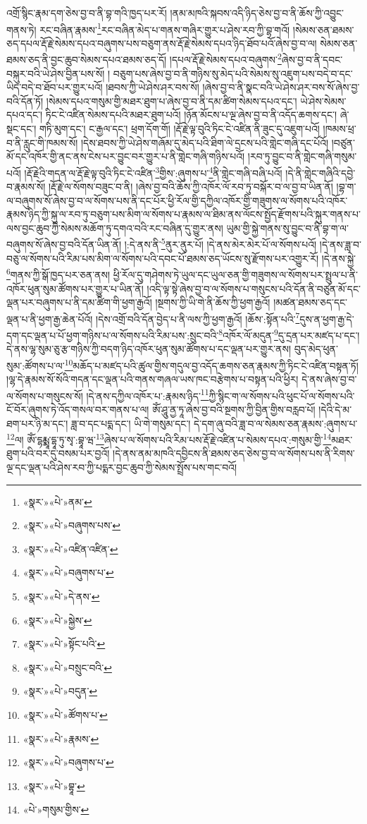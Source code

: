འགྲོ་སྙིང་རྣམ་དག་ཅེས་བྱ་བ་ནི་བྷ་གའི་ཁྱད་པར་རོ། །ནམ་མཁའི་སྐབས་འདི་ཉིད་ཅེས་བྱ་བ་ནི་ཆོས་ཀྱི་འབྱུང་གནས་ཏེ། རང་བཞིན་རྣམས་\footnote{«སྣར་»«པེ་»ནམ་}རང་བཞིན་མེད་པ་གནས་གཞིར་གྱུར་པ་ཤེས་རབ་ཀྱི་བྷ་གའོ། །སེམས་ཅན་ཐམས་ཅད་དཔལ་རྡོ་རྗེ་སེམས་དཔའ་བཞུགས་པས་བཅུག་ནས་རྡོ་རྗེ་སེམས་དཔའ་ཉིད་ཐོབ་པའོ་ཞེས་བྱ་བ་ལ། སེམས་ཅན་ཐམས་ཅད་ནི་བྱང་ཆུབ་སེམས་དཔའ་ཐམས་ཅད་དོ། །དཔལ་རྡོ་རྗེ་སེམས་དཔའ་བཞུགས་\footnote{«སྣར་»«པེ་»བཞུགས་པས་}ཞེས་བྱ་བ་ནི་དབང་བསྐུར་བའི་ཡེ་ཤེས་བྱིན་པས་སོ། །
བཅུག་པས་ཞེས་བྱ་བ་ནི་གཉིས་སུ་མེད་པའི་སེམས་སུ་འཇུག་པས་བདེ་བ་དང་ཡིད་བདེ་བ་ཐོབ་པར་གྱུར་པའོ། །ཐབས་ཀྱི་ཡེ་ཤེས་ཤར་བས་སོ། །ཞེས་བྱ་བ་ནི་སྣང་བའི་ཡེ་ཤེས་ཤར་བས་སོ་ཞེས་བྱ་བའི་དོན་ཏོ། །སེམས་དཔའ་གསུམ་གྱི་མཐར་ཐུག་པ་ཞེས་བྱ་བ་ནི་དམ་ཚིག་སེམས་དཔའ་དང་། ཡེ་ཤེས་སེམས་དཔའ་དང་། ཏིང་ངེ་འཛིན་སེམས་དཔའི་མཐར་ཐུག་པའོ། །ཉོན་མོངས་པ་ལྔ་ཞེས་བྱ་བ་ནི་འདོད་ཆགས་དང་། ཞེ་སྡང་དང་། གཏི་མུག་དང་། ང་རྒྱལ་དང་། ཕྲག་དོག་གོ། །རྡོ་རྗེ་ལྟ་བུའི་ཏིང་ངེ་འཛིན་ནི་ཟུང་དུ་འཇུག་པའོ། །ཁམས་ཕྲ་བ་ནི་རླུང་གི་ཁམས་སོ། །དེས་ཐབས་ཀྱི་ཡེ་ཤེས་གཞོམ་དུ་མེད་པའི་ཐིག་ལེ་དྲངས་པའི་གླེང་གཞི་དང་པོའོ། །བཙུན་མོ་དང་འཁོར་གྱི་ནང་ནས་ངེས་པར་བྱུང་བར་གྱུར་པ་ནི་གླེང་གཞི་གཉིས་པའོ། །རབ་ཏུ་བྱུང་བ་ནི་གླེང་གཞི་གསུམ་པའོ། །རྡོ་རྗེའི་གདན་ལ་རྡོ་རྗེ་ལྟ་བུའི་ཏིང་ངེ་འཛིན་\footnote{«སྣར་»«པེ་»འཛིན་འཛིན་}གྱིས་:ཞུགས་པ་\footnote{«སྣར་»«པེ་»བཞུགས་པ་}ནི་གླེང་གཞི་བཞི་པའོ། །དེ་ནི་གླེང་གཞིའི་དབྱེ་བ་རྣམས་སོ། །རྡོ་རྗེ་ལ་སོགས་བཟུང་བ་ནི། །ཞེས་བྱ་བའི་ཆོས་ཀྱི་འཁོར་ལོ་རབ་ཏུ་བསྐོར་བ་ལ་བྱ་བ་ཡིན་ནོ། །བྷ་ག་ལ་བཞུགས་སོ་ཞེས་བྱ་བ་ལ་སོགས་པས་ནི་དང་པོར་ཕྱི་རོལ་གྱི་དཀྱིལ་འཁོར་གྱི་གཟུགས་ལ་སོགས་པའི་འཁོར་རྣམས་ཉིད་ཀྱི་སྐུ་ལ་རབ་ཏུ་བཅུག་པས་མིག་ལ་སོགས་པ་རྣམས་ལ་ཐིམ་ནས་ལོངས་སྤྱོད་རྫོགས་པའི་སྐུར་གནས་པ་ལས་བྱང་ཆུབ་ཀྱི་སེམས་མཆོག་ཏུ་དགའ་བའི་རང་བཞིན་དུ་གྱུར་ནས། ཡུམ་གྱི་སྐྱེ་གནས་སུ་བྱུང་བ་ནི་བྷ་ག་ལ་བཞུགས་སོ་ཞེས་བྱ་བའི་དོན་ཡིན་ནོ། །:དེ་ནས་ནི་\footnote{«སྣར་»«པེ་»དེ་ནས་}ནུར་ནུར་པོ། །དེ་ནས་མེར་མེར་པོ་ལ་སོགས་པའོ། །དེ་ནས་ཟླ་བ་བཅུ་ལ་སོགས་པའི་རིམ་པས་མིག་ལ་སོགས་པའི་དབང་པོ་ཐམས་ཅད་ཡོངས་སུ་རྫོགས་པར་འགྱུར་རོ། །དེ་ནས་སྐྱེ་\footnote{«སྣར་»«པེ་»སྐྱེས་}གནས་ཀྱི་སྒོ་ཁྱད་པར་ཅན་ནས། ཕྱི་རོལ་དུ་གཤེགས་ཏེ་ཡུལ་དང་ཡུལ་ཅན་གྱི་གཟུགས་ལ་སོགས་པར་སྤྲུལ་པ་ནི་འཁོར་ཕུན་སུམ་ཚོགས་པར་གྱུར་པ་ཡིན་ནོ། །འདི་ལྟ་སྟེ་ཞེས་བྱ་བ་ལ་སོགས་པ་གསུངས་པའི་དོན་ནི་བཙུན་མོ་དང་ལྡན་པར་བཞུགས་པ་ནི་དམ་ཚིག་གི་ཕྱག་རྒྱའོ། །སྔགས་ཀྱི་ཡི་གེ་ནི་ཆོས་ཀྱི་ཕྱག་རྒྱའོ། །མཚན་ཐམས་ཅད་དང་ལྡན་པ་ནི་ཕྱག་རྒྱ་ཆེན་པོའོ། །དེས་འགྲོ་བའི་དོན་བྱེད་པ་ནི་ལས་ཀྱི་ཕྱག་རྒྱའོ། །ཆོས་:སྟོན་པའི་\footnote{«སྣར་»«པེ་»སྟོང་པའི་}དུས་ན་ཕྱག་རྒྱ་དེ་དག་དང་ལྡན་པ་པོ་ཕྱག་གཉིས་པ་ལ་སོགས་པའི་རིམ་པས་:སྲུང་བའི་\footnote{«སྣར་»«པེ་»བསྲུང་བའི་}འཁོར་ལོ་མདུན་\footnote{«སྣར་»«པེ་»བདུན་}དུ་དྲན་པར་མཛད་པ་དང་། དེ་ནས་ལྷ་སུམ་ཅུ་རྩ་གཉིས་ཀྱི་བདག་ཉིད་འཁོར་ཕུན་སུམ་ཚོགས་པ་དང་ལྡན་པར་གྱུར་ནས། བུད་མེད་ཕུན་སུམ་:ཚོགས་པ་ལ་\footnote{«སྣར་»«པེ་»ཚོགས་པ་}མཆོད་པ་མཛད་པའི་ཚུལ་གྱིས་གདུལ་བྱ་འདོད་ཆགས་ཅན་རྣམས་ཀྱི་ཏིང་ངེ་འཛིན་བསྟན་ཏོ། །ལྷ་དེ་རྣམས་སོ་སོའི་གདན་དང་ལྡན་པའི་གནས་གཞལ་ཡས་ཁང་བརྩེགས་པ་བསྟན་པའི་ཕྱིར། དེ་ནས་ཞེས་བྱ་བ་ལ་སོགས་པ་གསུངས་སོ། །དེ་ནས་དཀྱིལ་འཁོར་པ་:རྣམས་ཉིད་\footnote{«སྣར་»«པེ་»རྣམས་}ཀྱི་སྙིང་ག་ལ་སོགས་པའི་ཕུང་པོ་ལ་སོགས་པའི་ངོ་བོར་ཞུགས་ཏེ་འོད་གསལ་བར་གནས་པ་ལ། ཨོཾ་ཤཱུ་ནྱ་ཏཱ་ཞེས་བྱ་བའི་སྔགས་ཀྱི་བྱིན་གྱིས་བརླབ་པོ། །དེའི་དེ་མ་ཐག་པར་ཉི་མ་དང་། ཟླ་བ་དང་པདྨ་དང་། ཡི་གེ་གསུམ་དང་། དེ་དག་ཞུ་བའི་ཟླ་བ་ལ་སེམས་ཅན་རྣམས་:ཞུགས་པ་\footnote{«སྣར་»«པེ་»བཞུགས་པ་}ལ། ཨོཾ་དྷརྨྨཱ་དྷཱ་ཏུ་སྭ་:བྷཱ་ཝ་\footnote{«སྣར་»«པེ་»བྷཱ་}ཞེས་པ་ལ་སོགས་པའི་རིམ་པས་རྡོ་རྗེ་འཛིན་པ་སེམས་དཔའ་:གསུམ་གྱི་\footnote{«པེ་»གསུམ་གྱིས་}མཐར་ཐུག་པའི་བར་དུ་བསམ་པར་བྱའོ། །དེ་ནས་ནམ་མཁའི་དབྱིངས་ནི་ཐམས་ཅད་ཅེས་བྱ་བ་ལ་སོགས་པས་ནི་རིགས་ལྔ་དང་ལྡན་པའི་ཤེས་རབ་ཀྱི་པདྨར་བྱང་ཆུབ་ཀྱི་སེམས་སྤྲོས་པས་གང་བའོ། 